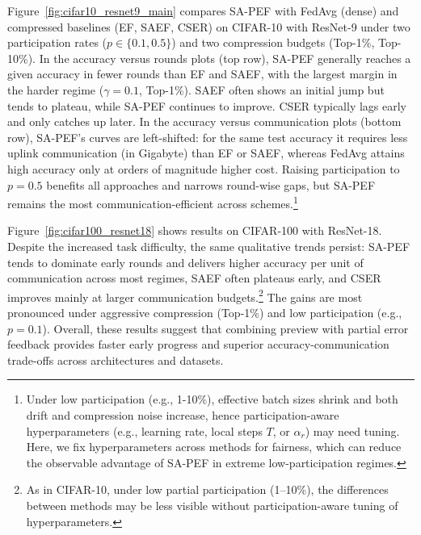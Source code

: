 \documentclass{article} %
\begin{document}
Figure~\ref{fig:cifar10_resnet9_main} compares SA-PEF with FedAvg (dense) and compressed baselines (EF, SAEF, CSER) on CIFAR-10 with ResNet-9 under two participation rates ($p\in\{0.1,0.5\}$) and two compression budgets (Top-1\%, Top-10\%).
In the accuracy versus rounds plots (top row), SA-PEF generally reaches a given accuracy in fewer rounds than EF and SAEF, with the largest margin in the harder regime ($\gamma{=}0.1$, Top-1\%). SAEF often shows an initial jump but tends to plateau, while SA-PEF continues to improve. CSER typically lags early and only catches up later.
In the accuracy versus communication plots (bottom row), SA-PEF’s curves are left-shifted: for the same test accuracy it requires less uplink communication (in Gigabyte) than EF or SAEF, whereas FedAvg attains high accuracy only at orders of magnitude higher cost.
Raising participation to $p{=}0.5$ benefits all approaches and narrows round-wise gaps, but SA-PEF remains the most communication-efficient across schemes.\footnote{Under low participation (e.g., 1-10\%), effective batch sizes shrink and both drift and compression noise increase, hence participation-aware hyperparameters (e.g., learning rate, local steps $T$, or $\alpha_r$) may need tuning. Here, we fix hyperparameters across methods for fairness, which can reduce the observable advantage of SA-PEF in extreme low-participation regimes.}

Figure~\ref{fig:cifar100_resnet18} shows results on CIFAR-100 with ResNet-18. Despite the increased task difficulty, the same qualitative trends persist: SA-PEF tends to dominate early rounds and delivers higher accuracy per unit of communication across most regimes, SAEF often plateaus early, and CSER improves mainly at larger communication budgets.\footnote{As in CIFAR-10, under low partial participation (1–10\%), the differences between methods may be less visible without participation-aware tuning of hyperparameters.}  The gains are most pronounced under aggressive compression (Top-1\%) and low participation (e.g., $p{=}0.1$).
Overall, these results suggest that combining preview with partial error feedback provides faster early progress and superior accuracy-communication trade-offs across architectures and datasets.
\end{document}
